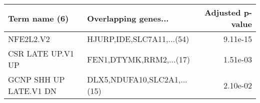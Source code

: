 \begin{tabular}{llr}
\toprule
         Term name (6) &        Overlapping genes... &  Adjusted p-value \\
\midrule
             NFE2L2.V2 &   HJURP,IDE,SLC7A11,...(54) &          9.11e-15 \\
     CSR LATE UP.V1 UP &     FEN1,DTYMK,RRM2,...(17) &          1.51e-03 \\
GCNP SHH UP LATE.V1 DN & DLX5,NDUFA10,SLC2A1,...(15) &          2.10e-02 \\
\bottomrule
\end{tabular}
